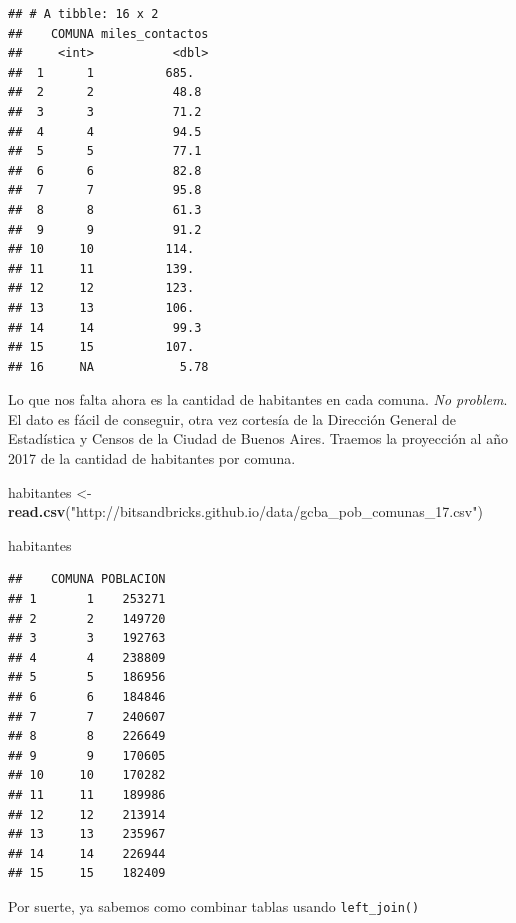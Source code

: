 \documentclass[spanish,]{book}
\newenvironment{Shaded}{\begin{snugshade}}{\end{snugshade}}
\newcommand{\KeywordTok}[1]{\textcolor[rgb]{0.13,0.29,0.53}{\textbf{#1}}}
\newcommand{\NormalTok}[1]{#1}
\newcommand{\OperatorTok}[1]{\textcolor[rgb]{0.81,0.36,0.00}{\textbf{#1}}}
\newcommand{\StringTok}[1]{\textcolor[rgb]{0.31,0.60,0.02}{#1}}
\begin{document}
\begin{verbatim}
## # A tibble: 16 x 2
##    COMUNA miles_contactos
##     <int>           <dbl>
##  1      1          685.  
##  2      2           48.8 
##  3      3           71.2 
##  4      4           94.5 
##  5      5           77.1 
##  6      6           82.8 
##  7      7           95.8 
##  8      8           61.3 
##  9      9           91.2 
## 10     10          114.  
## 11     11          139.  
## 12     12          123.  
## 13     13          106.  
## 14     14           99.3 
## 15     15          107.  
## 16     NA            5.78
\end{verbatim}

Lo que nos falta ahora es la cantidad de habitantes en cada comuna. \emph{No problem}. El dato es fácil de conseguir, otra vez cortesía de la Dirección General de Estadística y Censos de la Ciudad de Buenos Aires. Traemos la proyección al año 2017 de la cantidad de habitantes por comuna.

\begin{Shaded}
\begin{Highlighting}[]
\NormalTok{habitantes <-}\StringTok{ }\KeywordTok{read.csv}\NormalTok{(}\StringTok{"http://bitsandbricks.github.io/data/gcba_pob_comunas_17.csv"}\NormalTok{)}

\NormalTok{habitantes}
\end{Highlighting}
\end{Shaded}

\begin{verbatim}
##    COMUNA POBLACION
## 1       1    253271
## 2       2    149720
## 3       3    192763
## 4       4    238809
## 5       5    186956
## 6       6    184846
## 7       7    240607
## 8       8    226649
## 9       9    170605
## 10     10    170282
## 11     11    189986
## 12     12    213914
## 13     13    235967
## 14     14    226944
## 15     15    182409
\end{verbatim}

Por suerte, ya sabemos como combinar tablas usando \texttt{left\_join()}

\begin{Shaded}
\end{Shaded}
\end{document}

